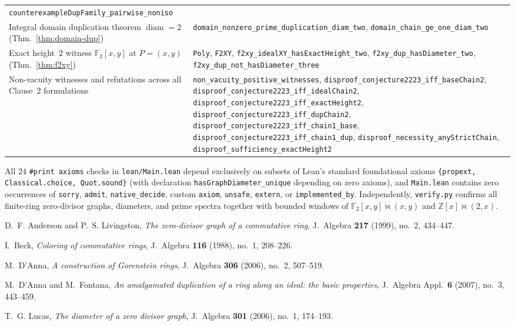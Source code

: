\documentclass[11pt]{article}
\theoremstyle{definition}
\newcommand{\diam}{\operatorname{diam}}
\newcommand{\FF}{\mathbb{F}}
\newcommand{\ZZ}{\mathbb{Z}}
\begin{document}
\begin{table}[htbp]
\begin{tabular}{@{}>{\raggedright\arraybackslash}p{}>{\raggedright\arraybackslash}p{}@{}}
\texttt{counterexampleDupFamily\_pairwise\_noniso} \\
\addlinespace[3pt]
Integral domain duplication theorem $\diam = 2$ (Thm.~\ref{thm:domain-dup}) &
\texttt{domain\_nonzero\_prime\_duplication\_diam\_two},
\texttt{domain\_chain\_ge\_one\_diam\_two} \\
\addlinespace[3pt]
Exact height~$2$ witness $\FF_2[x, y]$ at $P = (x, y)$ (Thm.~\ref{thm:f2xy}) &
\texttt{Poly}, \texttt{F2XY}, \texttt{f2xy\_idealXY\_hasExactHeight\_two},
\texttt{f2xy\_dup\_hasDiameter\_two}, \texttt{f2xy\_dup\_not\_hasDiameter\_three} \\
\addlinespace[3pt]
Non-vacuity witnesses and refutations across all Clause~2 formulations &
\texttt{non\_vacuity\_positive\_witnesses},
\texttt{disproof\_conjecture2223\_iff\_baseChain2},
\texttt{disproof\_conjecture2223\_iff\_idealChain2},
\texttt{disproof\_conjecture2223\_iff\_exactHeight2},
\texttt{disproof\_conjecture2223\_iff\_dupChain2},
\texttt{disproof\_conjecture2223\_iff\_chain1\_base},
\texttt{disproof\_conjecture2223\_iff\_chain1\_dup},
\texttt{disproof\_necessity\_anyStrictChain},
\texttt{disproof\_sufficiency\_exactHeight2} \\
\bottomrule
\end{tabular}
\end{table}

{\sloppy
All $24$ \texttt{\#print axioms} checks in \texttt{lean/Main.lean} depend exclusively on
subsets of Lean's standard foundational axioms
\texttt{\{propext, Classical.choice, Quot.sound\}} (with declaration
\texttt{hasGraphDiameter\_unique} depending on zero axioms), and \texttt{Main.lean}
contains zero occurrences of \texttt{sorry}, \texttt{admit}, \texttt{native\_decide},
custom \texttt{axiom}, \texttt{unsafe}, \texttt{extern}, or \texttt{implemented\_by}.
Independently, \texttt{verify.py} confirms all finite-ring zero-divisor graphs, diameters,
and prime spectra together with bounded windows of $\FF_2[x, y] \bowtie (x, y)$ and
$\ZZ[x] \bowtie (2, x)$.\par}

\begin{thebibliography}{9}

D.~F. Anderson and P.~S. Livingston,
\emph{The zero-divisor graph of a commutative ring},
J.~Algebra \textbf{217} (1999), no.~2, 434--447.

I.~Beck,
\emph{Coloring of commutative rings},
J.~Algebra \textbf{116} (1988), no.~1, 208--226.

M.~D'Anna,
\emph{A construction of Gorenstein rings},
J.~Algebra \textbf{306} (2006), no.~2, 507--519.

M.~D'Anna and M.~Fontana,
\emph{An amalgamated duplication of a ring along an ideal: the basic properties},
J.~Algebra Appl.\ \textbf{6} (2007), no.~3, 443--459.

T.~G. Lucas,
\emph{The diameter of a zero divisor graph},
J.~Algebra \textbf{301} (2006), no.~1, 174--193.

\end{thebibliography}
\end{document}

